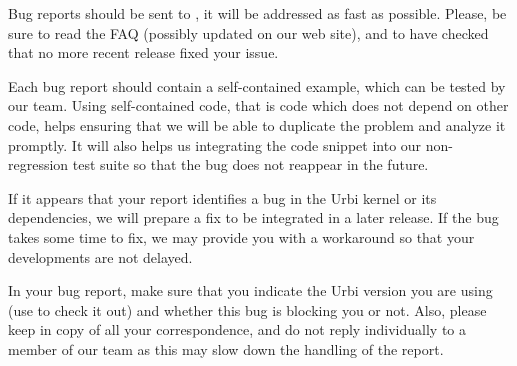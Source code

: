 Bug reports should be sent to , it
will be addressed as fast as possible.  Please, be sure to read the
FAQ (possibly updated on our web site), and to have checked that no
more recent release fixed your issue.

Each bug report should contain a self-contained example, which can be
tested by our team. Using self-contained code, that is code which does
not depend on other code, helps ensuring that we will be able to
duplicate the problem and analyze it promptly. It will also helps us
integrating the code snippet into our non-regression test suite so
that the bug does not reappear in the future.

If it appears that your report identifies a bug in the Urbi kernel or
its dependencies, we will prepare a fix to be integrated in a later
release. If the bug takes some time to fix, we may provide you with a
workaround so that your developments are not delayed.

In your bug report, make sure that you indicate the Urbi version you
are using (use  to check it out) and whether this
bug is blocking you or not. Also, please keep
 in copy of all your
correspondence, and do not reply individually to a member of our team
as this may slow down the handling of the report.


\ifx\ifHtml\undefined\else
  \let\subsubsection\subsubsectionSave
\fi


